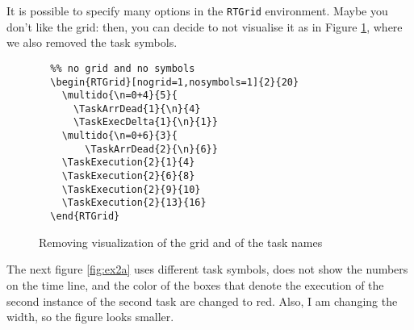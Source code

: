 \documentclass{article}
\begin{document}
It is possible to specify many options in the \texttt{RTGrid}
environment.  Maybe you don't like the grid: then, you can decide to
not visualise it as in Figure \ref{fig:ex2}, where we also removed the
task symbols.
\begin{figure}[h]
  \centering
  \begin{RTGrid}[nogrid=1,nosymbols=1]{2}{20}
  \end{RTGrid}
\begin{verbatim}
  %% no grid and no symbols
  \begin{RTGrid}[nogrid=1,nosymbols=1]{2}{20}
    \multido{\n=0+4}{5}{         
      \TaskArrDead{1}{\n}{4}    
      \TaskExecDelta{1}{\n}{1}}
    \multido{\n=0+6}{3}{         
        \TaskArrDead{2}{\n}{6}}
    \TaskExecution{2}{1}{4}
    \TaskExecution{2}{6}{8}
    \TaskExecution{2}{9}{10}
    \TaskExecution{2}{13}{16}        
  \end{RTGrid}
\end{verbatim}
  \caption{Removing visualization of the grid and of the task names}
  \label{fig:ex2}
\end{figure}

The next figure \ref{fig:ex2a} uses different task symbols, does not
show the numbers on the time line, and the color of the boxes that
denote the execution of the second instance of the second task are
changed to red. Also, I am changing the width, so the figure looks
smaller.
\end{document}
